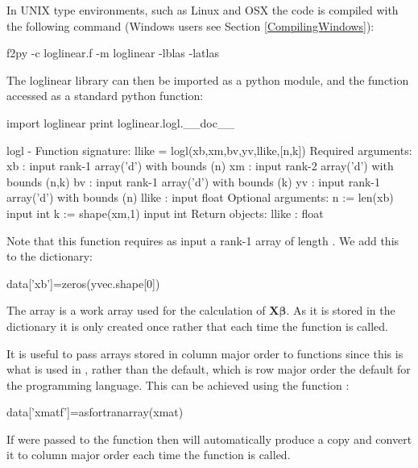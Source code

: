 \documentclass[article]{jss}
\begin{document}
In UNIX type environments, such as Linux and OSX the code is compiled
with the following command (Windows users see Section
\ref{CompilingWindows}):

\begin{Code}
f2py -c loglinear.f -m loglinear -lblas -latlas
\end{Code}

The loglinear library can then be imported as a python module, and the function  accessed as a standard python function:

\begin{CodeChunk}
\begin{CodeInput}
import loglinear
print loglinear.logl.__doc__
\end{CodeInput}
\begin{CodeOutput}
logl - Function signature:
  llike = logl(xb,xm,bv,yv,llike,[n,k])
Required arguments:
  xb : input rank-1 array('d') with bounds (n)
  xm : input rank-2 array('d') with bounds (n,k)
  bv : input rank-1 array('d') with bounds (k)
  yv : input rank-1 array('d') with bounds (n)
  llike : input float
Optional arguments:
  n := len(xb) input int
  k := shape(xm,1) input int
Return objects:
  llike : float
\end{CodeOutput}
\end{CodeChunk}

Note that this function requires as input  a rank-1 array of length
. We add this to the  dictionary:
\begin{Code}
data['xb']=zeros(yvec.shape[0])
\end{Code}
The array  is a work array used for the
calculation of $\bm{X}\bm{\beta}.$ As it is stored in the
 dictionary  it is only created once
rather that each time the function  is called.

It is useful to pass arrays stored in column major order to 
functions since this is what is used in , rather
than the  default, which is row major order the
default for the  programming language. This can be
achieved using the  function :
\begin{Code}
data['xmatf']=asfortranarray(xmat)
\end{Code}
If  were passed to the function
 then  will automatically produce a
copy and convert it to column major order each time the function
 is called.
\end{document}
